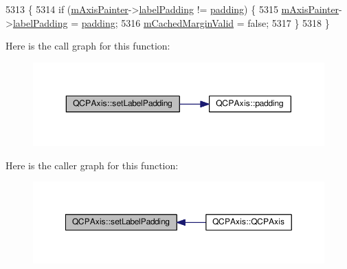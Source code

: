 \begin{DoxyCode}
5313                                          \{
5314   \textcolor{keywordflow}{if} (\hyperlink{class_q_c_p_axis_aeeae00935bd2dab82d64f32544a90913}{mAxisPainter}->\hyperlink{class_q_c_p_axis_painter_private_a3f7465372df132bf7814345ea697dd34}{labelPadding} != \hyperlink{class_q_c_p_axis_abb85015a9467ec176e70698307ec833a}{padding}) \{
5315     \hyperlink{class_q_c_p_axis_aeeae00935bd2dab82d64f32544a90913}{mAxisPainter}->\hyperlink{class_q_c_p_axis_painter_private_a3f7465372df132bf7814345ea697dd34}{labelPadding} = \hyperlink{class_q_c_p_axis_abb85015a9467ec176e70698307ec833a}{padding};
5316     \hyperlink{class_q_c_p_axis_a2cde37b6e385f47e11322df4ac1b0e9b}{mCachedMarginValid} = \textcolor{keyword}{false};
5317   \}
5318 \}
\end{DoxyCode}


Here is the call graph for this function\+:\nopagebreak
\begin{figure}[H]
\begin{center}
\leavevmode
\includegraphics[width=350pt]{class_q_c_p_axis_a4391192a766e5d20cfe5cbc17607a7a2_cgraph}
\end{center}
\end{figure}




Here is the caller graph for this function\+:\nopagebreak
\begin{figure}[H]
\begin{center}
\leavevmode
\includegraphics[width=350pt]{class_q_c_p_axis_a4391192a766e5d20cfe5cbc17607a7a2_icgraph}
\end{center}
\end{figure}


\hypertarget{class_q_c_p_axis_a08af1c72db9ae4dc8cb8a973d44405ab}{}
